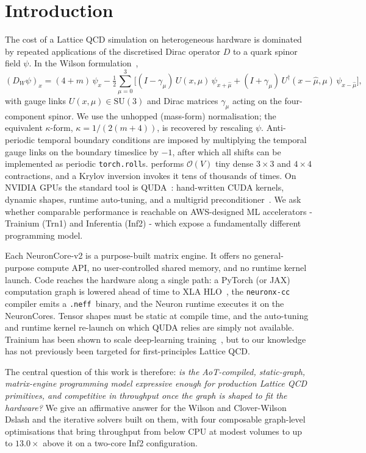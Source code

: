 \documentclass[a4paper,11pt]{article}
\newcommand{\NEFF}{\texttt{.neff}}
\begin{document}
\section{Introduction}
\label{sec:intro}

The cost of a Lattice QCD simulation on heterogeneous hardware is
dominated by repeated applications of the discretised Dirac operator
$D$ to a quark spinor field $\psi$. In the Wilson
formulation~\cite{Wilson:1974sk},
\begin{equation}
(D_W \psi)_x = (4+m)\,\psi_x - \tfrac{1}{2}\sum_{\mu=0}^{3}\!\Big[
  (I-\gamma_\mu)\,U(x,\mu)\,\psi_{x+\hat\mu}
  + (I+\gamma_\mu)\,U^{\dagger}(x{-}\hat\mu,\mu)\,\psi_{x-\hat\mu}\Big],
\label{eq:wilson}
\end{equation}
with gauge links $U(x,\mu)\!\in\!\mathrm{SU}(3)$ and Dirac matrices
$\gamma_\mu$ acting on the four-component spinor. We use the
unhopped (mass-form) normalisation; the equivalent $\kappa$-form,
$\kappa = 1/(2(m+4))$, is recovered by rescaling $\psi$. Anti-periodic
temporal boundary conditions are imposed by multiplying the temporal
gauge links on the boundary timeslice by $-1$, after which all shifts
can be implemented as periodic \texttt{torch.roll}s.
performs $\mathcal{O}(V)$ tiny dense $3{\times}3$ and $4{\times}4$
contractions, and a Krylov inversion invokes it tens of thousands of
times. On NVIDIA GPUs the standard tool is
\textsc{QUDA}~\cite{Clark:2009wm,Babich:2011np}: hand-written CUDA
kernels, dynamic shapes, runtime auto-tuning, and a multigrid
preconditioner~\cite{Brower:2018kgy}. We ask whether comparable
performance is reachable on AWS-designed ML accelerators - Trainium
(Trn1) and Inferentia (Inf2) - which expose a fundamentally
different programming model.

Each NeuronCore-v2 is a purpose-built matrix engine. It offers no
general-purpose compute API, no user-controlled shared memory, and no
runtime kernel launch. Code reaches the hardware along a single path:
a PyTorch (or JAX) computation graph is lowered ahead of time to
XLA HLO~\cite{xla}, the \texttt{neuronx-cc} compiler emits a
\NEFF\ binary, and the Neuron runtime executes it on the NeuronCores.
Tensor shapes must be static at compile time, and the auto-tuning and
runtime kernel re-launch on which QUDA relies are simply not available.
Trainium has been shown to scale deep-learning
training~\cite{aws-trainium}, but to our knowledge has not previously
been targeted for first-principles Lattice QCD.

The central question of this work is therefore: \emph{is the
AoT-compiled, static-graph, matrix-engine programming model
expressive enough for production Lattice QCD primitives, and
competitive in throughput once the graph is shaped to fit the
hardware?} We give an affirmative answer for the Wilson and
Clover-Wilson Dslash and the iterative solvers built on them, with
four composable graph-level optimisations that bring throughput from
below CPU at modest volumes to up to $13.0\times$ above it on a
two-core Inf2 configuration.
\end{document}
